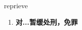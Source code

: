 
\begin{frame}
{\huge reprieve}
\begin{center}
\begin{enumerate}\Large
  \item \textbf{对...暂缓处刑，免罪}
\end{enumerate}
\end{center}
\end{frame}
